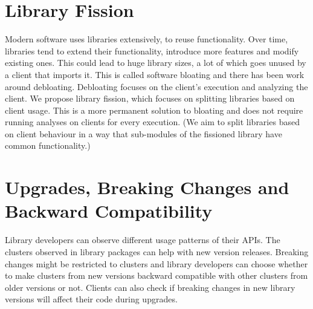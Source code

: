\section{Library Fission}
Modern software uses libraries extensively, to reuse functionality. Over time, libraries tend to extend their functionality, introduce more features and modify existing ones. This could lead to huge library sizes, a lot of which goes unused by a client that imports it. This is called software bloating and there has been work around debloating. Debloating focuses on the client’s execution and analyzing the client. We propose library fission, which focuses on splitting libraries based on client usage. This is a more permanent solution to bloating and does not require running analyses on clients for every execution. (We aim to split libraries based on client behaviour in a way that sub-modules of the fissioned library have common functionality.)

\section{Upgrades, Breaking Changes and Backward Compatibility}
Library developers can observe different usage patterns of their APIs. The clusters observed in library packages can help with new version releases. Breaking changes might be restricted to clusters and library developers can choose whether to make clusters from new versions backward compatible with other clusters from older versions or not. Clients can also check if breaking changes in new library versions will affect their code during upgrades. 